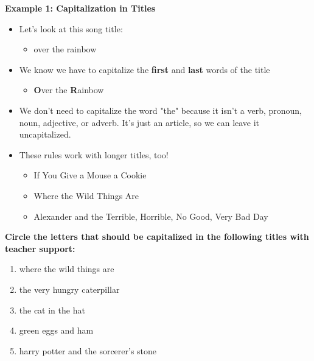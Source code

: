 \documentclass[12pt]{article}
\begin{document}
\begin{tcolorbox}[colframe=black!60, colback=white, 
coltitle=black, colbacktitle=black!15, fonttitle=\bfseries\Large, 
title=Examples, halign title=center, left=10pt, right=10pt, top=10pt, bottom=15pt]
\textbf{Example 1: Capitalization in Titles}
\begin{itemize}
    \item Let's look at this song title:
    \begin{itemize}
        \item over the rainbow
    \end{itemize}
\item We know we have to capitalize the \textbf{first} and \textbf{last }words of the title
\begin{itemize}
    \item \textbf{O}ver the \textbf{R}ainbow
\end{itemize}
\item We don't need to capitalize the word "the" because it isn't a verb, pronoun, noun, adjective, or adverb. It's just an article, so we can leave it uncapitalized.
\item These rules work with longer titles, too!
\begin{itemize}
    \item If You Give a Mouse a Cookie
    \item Where the Wild Things Are
    \item Alexander and the Terrible, Horrible, No Good, Very Bad Day 
  
 
    \end{itemize}
\end{itemize}




     \end{tcolorbox}

\vspace{1em}

\begin{tcolorbox}[colframe=black!60, colback=white, 
coltitle=black, colbacktitle=black!15, fonttitle=\bfseries\Large, 
title=Guided Practice, halign title=center, left=10pt, right=10pt, top=10pt, bottom=15pt]
\textbf{Circle the letters that should be capitalized in the following titles with teacher support:}
\begin{enumerate}[itemsep=1em] %
    \item where the wild things are
    \item the very hungry caterpillar
    \item the cat in the hat
    \item green eggs and ham
    \item harry potter and the sorcerer's stone




\end{enumerate}
\end{tcolorbox}
\end{document}
